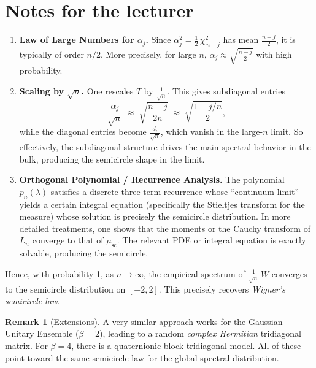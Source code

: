 \documentclass[letterpaper,11pt,oneside,reqno]{article}
\numberwithin{equation}{section}
\theoremstyle{definition}
\newtheorem{remark}[proposition]{Remark}
\newenvironment{lnotes}{\section*{Notes for the lecturer}}{}
\begin{document}
\begin{lnotes}
\begin{enumerate}[1.]
\item \textbf{Law of Large Numbers for \(\alpha_j\).}
   Since \(\alpha_j^2 = \tfrac12\,\chi^2_{\,n-j}\) has mean \(\tfrac{n-j}{2}\), it is typically of order \(n/2\).  More precisely, for large \(n\), \(\alpha_j \approx \sqrt{\tfrac{n-j}{2}}\) with high probability.

\item \textbf{Scaling by \(\sqrt{n}\).}
   One rescales \(T\) by \(\tfrac{1}{\sqrt{n}}\).  This gives subdiagonal entries
   \[
     \frac{\alpha_j}{\sqrt{n}}
     \;\approx\;
     \sqrt{\frac{n-j}{2n}}
     \;\approx\;
     \sqrt{\frac{1 - j/n}{2}},
   \]
   while the diagonal entries become \(\tfrac{d_i}{\sqrt{n}}\), which vanish in the large-\(n\) limit.  So effectively, the subdiagonal structure drives the main spectral behavior in the bulk, producing the semicircle shape in the limit.

\item \textbf{Orthogonal Polynomial / Recurrence Analysis.}
   The polynomial \(p_n(\lambda)\) satisfies a discrete three-term recurrence whose ``continuum limit'' yields a certain integral equation (specifically the Stieltjes transform for the measure) whose solution is precisely the semicircle distribution.  In more detailed treatments, one shows that the moments or the Cauchy transform of \(L_n\) converge to that of \(\mu_{\mathrm{sc}}\).  The relevant PDE or integral equation is exactly solvable, producing the semicircle.

\end{enumerate}

Hence, with probability 1, as \(n\to\infty\), the empirical spectrum of \(\tfrac{1}{\sqrt{n}}\,W\) converges to the semicircle distribution on \([-2,2]\).  This precisely recovers \emph{Wigner’s semicircle law}.

\begin{remark}[Extensions]
A very similar approach works for the Gaussian Unitary Ensemble (\(\beta=2\)), leading to a random \emph{complex Hermitian} tridiagonal matrix.  For \(\beta=4\), there is a quaternionic block-tridiagonal model.  All of these point toward the same semicircle law for the global spectral distribution.
\end{remark}


\end{lnotes}
\end{document}
